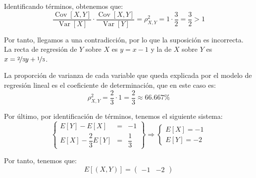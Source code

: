 \documentclass[12pt]{article}
\DeclareMathOperator{\Var}{Var}
\DeclareMathOperator{\Cov}{Cov}
\begin{document}
\begin{ejercicio}
\begin{enumerate}
            Identificando términos, obtenemos que:
            \begin{equation*}
                \dfrac{\Cov[X,Y]}{\Var[X]}\cdot \dfrac{\Cov[X,Y]}{\Var[Y]} = \rho_{X,Y}^2 = 1\cdot \dfrac{3}{2} = \dfrac{3}{2}>1
            \end{equation*}

            Por tanto, llegamos a una contradicción, por lo que la suposición es incorrecta. La recta de regresión de $Y$ sobre $X$ es $y=x-1$ y la de $X$ sobre $Y$ es $x=\nicefrac{2}{3}y+\nicefrac{1}{3}$.

            La proporción de varianza de cada variable que queda explicada por el modelo de regresión lineal es el coeficiente de determinación, que en este caso es:
            \begin{equation*}
                \rho_{X,Y}^2 = \dfrac{2}{3}\cdot 1=\dfrac{2}{3}\approx 66.667\%
            \end{equation*}

            Por último, por identificación de términos, tenemos el siguiente sistema:
            \begin{equation*}
                \left\{\begin{array}{rcl}
                    E[Y]-E[X]&=&-1 \\
                    E[X]-\dfrac{2}{3}E[Y]&=&\dfrac{1}{3}
                \end{array}\right\}
                \Longrightarrow
                \begin{cases}
                    E[X]=-1 \\
                    E[Y]=-2
                \end{cases}
            \end{equation*}

            Por tanto, tenemos que:
            \begin{equation*}
                E[(X,Y)] = \begin{pmatrix}
                    -1 & -2
                \end{pmatrix}
            \end{equation*}
        \end{enumerate}
    \end{ejercicio}
\end{document}

